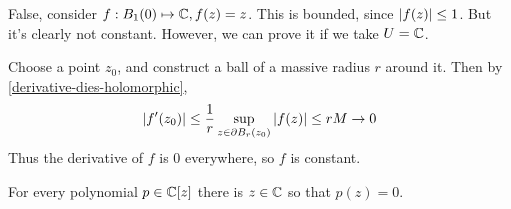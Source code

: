 \documentclass{homework}
\begin{document}
                                                                                                                                                                                                                                                          \begin{solution}
                                                                                                                                                                                                                                                          False, consider $f:B_1(0)\mapsto \mathbb{C}, f(z) = z$. This is bounded, since $\left|f(z)\right|\leq 1$. But it's clearly not constant. However, we can prove it if we take $U=\mathbb{C}$.

                                                                                                                                                                                                                                                          Choose a point $z_0$, and construct a ball of a massive radius $r$ around it. Then by \ref{derivative-dies-holomorphic}, 
                                                                                                                                                                                                                                                          \[\left|f'(z_0)\right| \leq \frac{1}{r}\sup_{z \in \partial B_r(z_0)} \left|f(z)\right| \leq rM \to 0\]
                                                                                                                                                                                                                                                          Thus the derivative of $f$ is 0 everywhere, so $f$ is constant.
                                                                                                                                                                                                                                                          \end{solution}
                                                                                                                                                                                                                                                          \begin{problem}
                                                                                                                                                                                                                                                            For every polynomial $p \in \mathbb{C}[z]$ there is $z \in \mathbb{C}$ so that $p(z) = 0$.
                                                                                                                                                                                                                                                            \end{problem}
\end{document}
